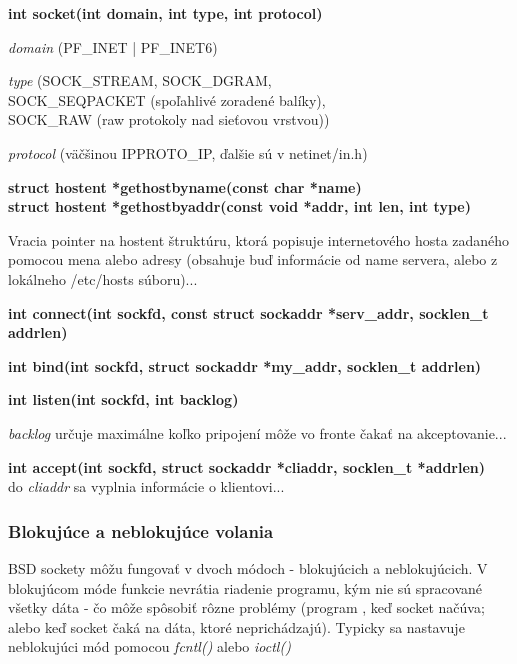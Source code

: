 \begin{pitemize}

\item \textbf{int socket(int domain, int type, int protocol)}
	\begin{pitemize}
		\item \emph{domain} (PF\_INET | PF\_INET6)
		\item \emph{type} (SOCK\_STREAM, SOCK\_DGRAM,\\SOCK\_SEQPACKET (spoľahlivé zoradené balíky),\\SOCK\_RAW (raw protokoly nad sieťovou vrstvou))
		\item \emph{protocol} (väčšinou IPPROTO\_IP, ďalšie sú v netinet/in.h)
	\end{pitemize}

	\item \textbf{struct hostent *gethostbyname(const char *name)\\
	struct hostent *gethostbyaddr(const void *addr, int len, int type)}
	\begin{pitemize}
		\item Vracia pointer na hostent štruktúru, ktorá popisuje internetového hosta zadaného pomocou mena alebo adresy (obsahuje buď informácie od name servera, alebo z lokálneho /etc/hosts súboru)...
	\end{pitemize}

	\item \textbf{int connect(int sockfd, const struct sockaddr *serv\_addr, socklen\_t addrlen)}
	\item \textbf{int bind(int sockfd, struct sockaddr *my\_addr, socklen\_t addrlen)}
	\item \textbf{int listen(int sockfd, int backlog)}
	\begin{pitemize}
		\item \emph{backlog} určuje maximálne koľko pripojení môže vo fronte čakať na akceptovanie...
	\end{pitemize}

	\item \textbf{int accept(int sockfd, struct sockaddr *cliaddr, socklen\_t *addrlen)}\\
	do \emph{cliaddr} sa vyplnia informácie o klientovi...
\end{pitemize}

\subsubsection*{Blokujúce a neblokujúce volania}
BSD sockety môžu fungovať v dvoch módoch - blokujúcich a neblokujúcich. V blokujúcom móde funkcie nevrátia riadenie programu, kým nie sú spracované všetky dáta - čo môže spôsobiť rôzne problémy (program , keď socket načúva; alebo keď socket čaká na dáta, ktoré neprichádzajú). Typicky sa nastavuje neblokujúci mód pomocou \emph{fcntl()} alebo \emph{ioctl()}

